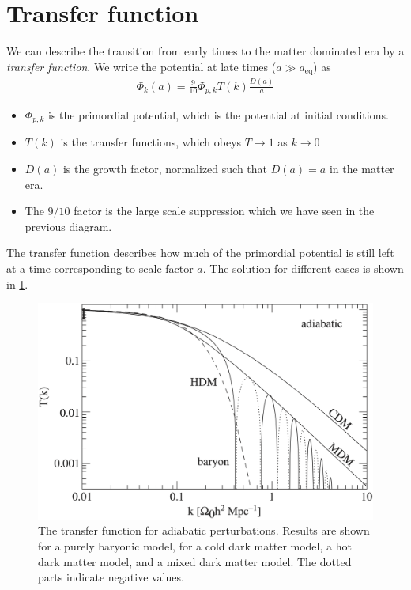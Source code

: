 \section{Transfer function}
We can describe the transition from early times to the matter dominated era by a \emph{transfer function}. We write the potential at late times ($a \gg a_\text{eq}$) as
\begin{align*}
	\Phi_k(a) = \frac{9}{10} \Phi_{p, k} T(k) \frac{D(a)}{a}
\end{align*}
\begin{itemize}
	\item $\Phi_{p, k}$ is the primordial potential, which is the potential at initial conditions.
	\item $T(k)$ is the transfer functions, which obeys $T \to 1$ as $k \to 0$
	\item $D(a)$ is the growth factor, normalized such that $D(a) = a$ in the matter era.
	\item The $9/10$ factor is the large scale suppression which we have seen in the previous diagram.
\end{itemize}
The transfer function describes how much of the primordial potential is still left at a time corresponding to scale factor $a$.
The solution for different cases is shown in \cref{fig:transfer-function}.
\begin{figure}
	\centering
	\includegraphics[width=\textwidth]{img/ch-03/transfer-function.png}
	\caption{The transfer function for adiabatic perturbations. Results are shown for a purely baryonic model, for a cold dark matter model, a hot dark matter model, and a mixed dark matter model. The dotted parts indicate negative values.}
	\label{fig:transfer-function}
\end{figure}

